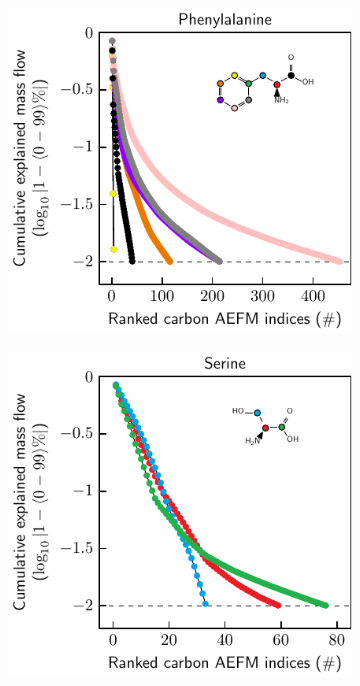 \documentclass[]{article}
\begin{document}
\begin{figure}
\begin{subfigure}[t]{0.247\textwidth}
    \end{subfigure}
    \begin{subfigure}[t]{0.247\textwidth}
        \caption{}
        \includegraphics[width=\textwidth]{subpanels/cumulative-source-met-29-log.pdf}\\
    \end{subfigure}
    \begin{subfigure}[t]{0.247\textwidth}
        \caption{}
        \includegraphics[width=\textwidth]{subpanels/cumulative-source-met-33-log.pdf}\\
    \end{subfigure}


\end{figure}
\end{document}
